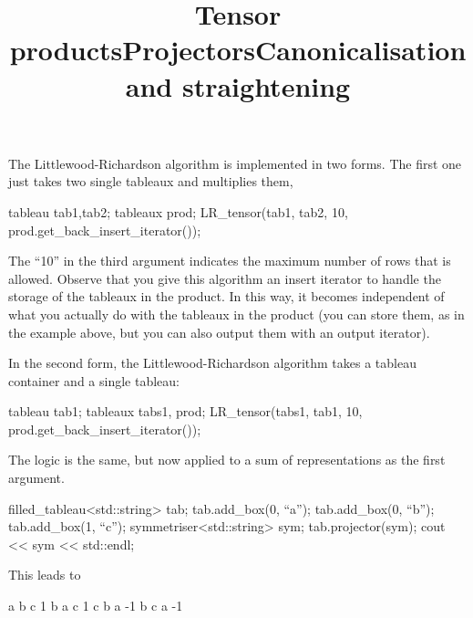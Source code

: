 \documentclass{kasper}
\begin{document}
\begin{sectionunit}
\begin{sectionunit}
\title{Tensor products}
\maketitle

The Littlewood-Richardson algorithm is implemented in two forms. The
first one just takes two single tableaux and multiplies them,
\begin{screen}
tableau tab1,tab2;
tableaux prod;
LR_tensor(tab1, tab2, 10, prod.get_back_insert_iterator());
\end{screen}
The ``10'' in the third argument indicates the maximum number of rows
that is allowed. Observe that you give this algorithm an insert
iterator to handle the storage of the tableaux in the product. In this
way, it becomes independent of what you actually do with the tableaux
in the product (you can store them, as in the example above, but you
can also output them with an output iterator).

In the second form, the Littlewood-Richardson algorithm takes a
tableau container and a single tableau:
\begin{screen}
tableau tab1;
tableaux tabs1, prod;
LR_tensor(tabs1, tab1, 10, prod.get_back_insert_iterator());
\end{screen}
The logic is the same, but now applied to a sum of representations as
the first argument.

\end{sectionunit}

\begin{sectionunit}
\title{Projectors}
\maketitle

\begin{screen}
filled_tableau<std::string> tab;
tab.add_box(0, ``a'');
tab.add_box(0, ``b'');
tab.add_box(1, ``c'');
symmetriser<std::string> sym;
tab.projector(sym);
cout << sym << std::endl;
\end{screen}
This leads to
\begin{screen}
a b c   1
b a c   1
c b a  -1
b c a  -1
\end{screen}

\end{sectionunit}

\begin{sectionunit}
\title{Canonicalisation and straightening}
\maketitle


\end{sectionunit}
\end{sectionunit}
\end{document}
